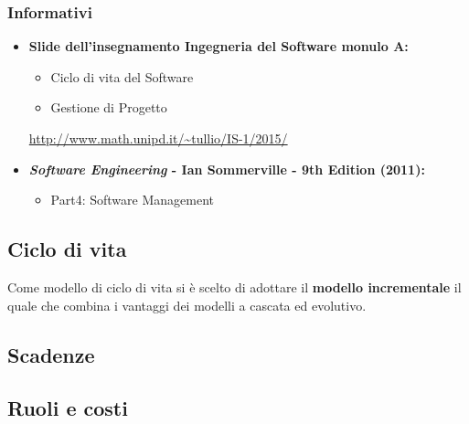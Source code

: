 \subsubsection{Informativi}
\begin{itemize}
\item \textbf{Slide dell'insegnamento Ingegneria del Software monulo A:}
\begin{itemize}
\item Ciclo di vita del Software
\item Gestione di Progetto
\end{itemize}
\url{http://www.math.unipd.it/~tullio/IS-1/2015/}
\item \textbf{\textit{Software Engineering} - Ian Sommerville - 9th Edition (2011):}
\begin{itemize}
\item Part4: Software Management
\end{itemize} 
\end{itemize}

\subsection{Ciclo di vita}
Come modello di ciclo di vita si è scelto di adottare il \textbf{modello incrementale} il quale che combina i vantaggi dei modelli a cascata ed evolutivo.

\subsection{Scadenze}

\subsection{Ruoli e costi}

